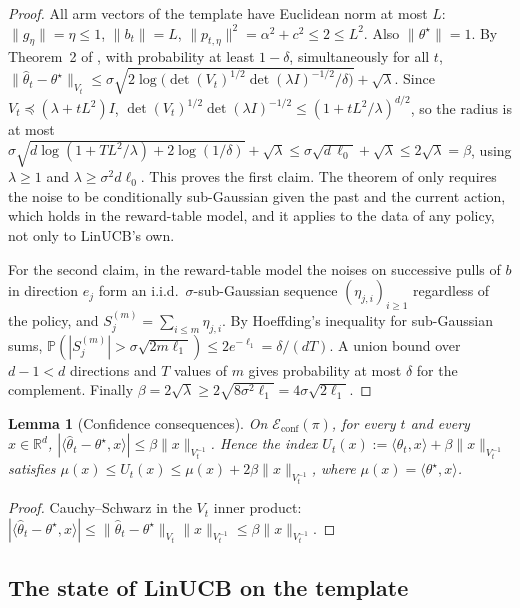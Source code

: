 \documentclass{article}
\newtheorem{lemma}{Lemma}
\theoremstyle{definition}
\theoremstyle{remark}
\newcommand{\R}{\mathbb{R}}
\newcommand{\Prb}{\mathbb{P}}
\theoremstyle{remark}
\begin{document}
\begin{proof}
All arm vectors of the template have Euclidean norm at most $L$: $\|g_\eta\|=\eta\le1$,
$\|b_t\|=L$, $\|p_{t,\eta}\|^2=\alpha^2+c^2\le2\le L^2$. Also $\|\theta^\star\|=1$.
By Theorem~2 of \cite{abbasi2011improved}, with probability at least
$1-\delta$, simultaneously for all $t$,
$\|\widehat\theta_t-\theta^\star\|_{V_t}\le\sigma\sqrt{2\log\bigl(\det(V_t)^{1/2}\det(\lambda I)^{-1/2}/\delta\bigr)}+\sqrt\lambda$.
Since $V_t\preceq(\lambda+tL^2)I$, $\det(V_t)^{1/2}\det(\lambda I)^{-1/2}\le(1+tL^2/\lambda)^{d/2}$,
so the radius is at most
$\sigma\sqrt{d\log(1+TL^2/\lambda)+2\log(1/\delta)}+\sqrt\lambda\le\sigma\sqrt{d\,\ell_0}+\sqrt\lambda\le2\sqrt\lambda=\beta$,
using $\lambda\ge1$ and $\lambda\ge\sigma^2d\ell_0$. This proves the first claim.
The theorem of \cite{abbasi2011improved} only requires the noise to be
conditionally sub-Gaussian given the past and the current action, which holds
in the reward-table model, and it applies to the data of any policy, not only
to LinUCB's own.

For the second claim, in the reward-table model the noises on successive pulls
of $b$ in direction $e_j$ form an i.i.d.\ $\sigma$-sub-Gaussian sequence
$(\eta_{j,i})_{i\ge1}$ regardless of the policy, and $S_j^{(m)}=\sum_{i\le m}\eta_{j,i}$.
By Hoeffding's inequality for sub-Gaussian sums,
$\Prb(|S_j^{(m)}|>\sigma\sqrt{2m\ell_1})\le2e^{-\ell_1}=\delta/(dT)$. A union
bound over $d-1<d$ directions and $T$ values of $m$ gives probability at most
$\delta$ for the complement. Finally $\beta=2\sqrt\lambda\ge2\sqrt{8\sigma^2\ell_1}=4\sigma\sqrt{2\ell_1}$.
\end{proof}

\begin{lemma}[Confidence consequences]
\label{lem:cat-conf}
On $\mathcal E_{\mathrm{conf}}(\pi)$, for every $t$ and every $x\in\R^d$,
$|\langle\widehat\theta_t-\theta^\star,x\rangle|\le\beta\|x\|_{V_t^{-1}}$.
Hence the index $U_t(x):=\langle\widehat\theta_t,x\rangle+\beta\|x\|_{V_t^{-1}}$
satisfies $\mu(x)\le U_t(x)\le\mu(x)+2\beta\|x\|_{V_t^{-1}}$, where
$\mu(x)=\langle\theta^\star,x\rangle$.
\end{lemma}

\begin{proof}
Cauchy--Schwarz in the $V_t$ inner product:
$|\langle\widehat\theta_t-\theta^\star,x\rangle|\le\|\widehat\theta_t-\theta^\star\|_{V_t}\|x\|_{V_t^{-1}}\le\beta\|x\|_{V_t^{-1}}$.
\end{proof}

\subsection{The state of LinUCB on the template}
\end{document}
